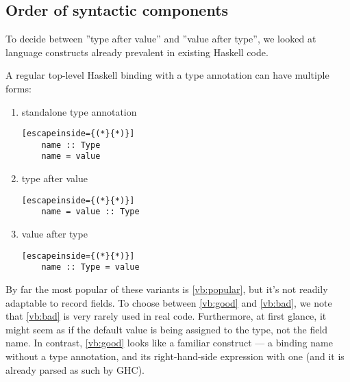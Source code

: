 \documentclass[en]{pracamgr}
\begin{document}
\subsection{Order of syntactic components}
To decide between ''type after value'' and ''value after type'', we looked at language constructs already prevalent in existing Haskell code.

A regular top-level Haskell binding with a type annotation can have multiple forms:
\begin{enumerate}
  \item \label{vb:popular} standalone type annotation
  \begin{lstlisting}[escapeinside={(*}{*)}]
    name :: Type 
    name = value
  \end{lstlisting}
  \item \label{vb:good} type after value
  \begin{lstlisting}[escapeinside={(*}{*)}]
    name = value :: Type
  \end{lstlisting}  
  \item \label{vb:bad} value after type
  \begin{lstlisting}[escapeinside={(*}{*)}]
    name :: Type = value
  \end{lstlisting}
\end{enumerate}

By far the most popular of these variants is \ref*{vb:popular}, but it's not readily adaptable to record fields.
To choose between \ref*{vb:good} and \ref*{vb:bad}, we note that \ref*{vb:bad} is very rarely used in real code.
Furthermore, at first glance, it might seem as if the default value is being assigned to the type, not the field name.
In contrast, \ref*{vb:good} looks like a familiar construct --- a binding name without a type annotation, and its right-hand-side expression with one (and it is already parsed as such by GHC).
\end{document}
